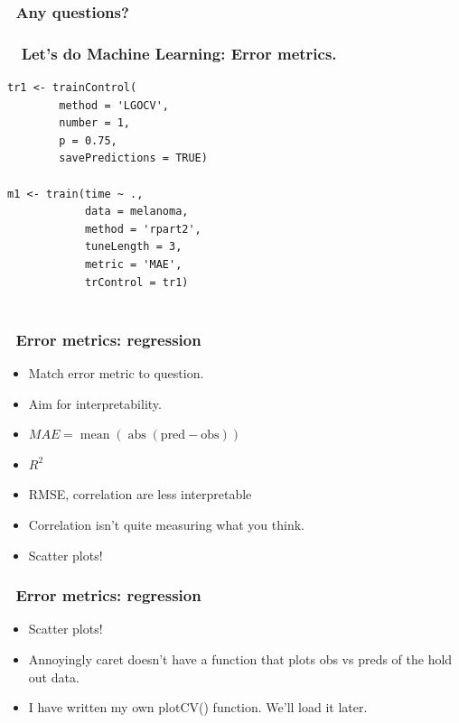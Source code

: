 \documentclass[handout, aspectratio = 169]{beamer}
\begin{document}
\begin{frame}
\frametitle{\insertframenumber~Any questions?}


\end{frame} 





\begin{frame}[fragile]
\frametitle{\insertframenumber~ Let's do Machine Learning: Error metrics.}
\renewcommand{\FancyVerbFormatLine}[1]{%
   \ifnum\value{FancyVerbLine}=11\color{cyan}#1%
   \else #1\fi}
\begin{Verbatim}
tr1 <- trainControl(
        method = 'LGOCV',
        number = 1,
        p = 0.75,
        savePredictions = TRUE)

m1 <- train(time ~ ., 
            data = melanoma,
            method = 'rpart2',
            tuneLength = 3,
            metric = 'MAE',
            trControl = tr1)
            
\end{Verbatim}

\end{frame} 


\begin{frame}
\frametitle{\insertframenumber~Error metrics: regression}

\begin{itemize}
\item Match error metric to question.
\item Aim for interpretability.
\item $MAE = \operatorname{mean}(\operatorname{abs}(\text{pred} - \text{obs})) $
\item $R^2$
\item RMSE, correlation are less interpretable
\item Correlation isn't quite measuring what you think.
\item Scatter plots!
\end{itemize}
\end{frame} 




\begin{frame}
\frametitle{\insertframenumber~Error metrics: regression}

\begin{itemize}
\item Scatter plots!
\item Annoyingly caret doesn't have a function that plots obs vs preds of the hold out data.
\item I have written my own plotCV() function. We'll load it later.
\end{itemize}
\end{frame} 
\end{document}
